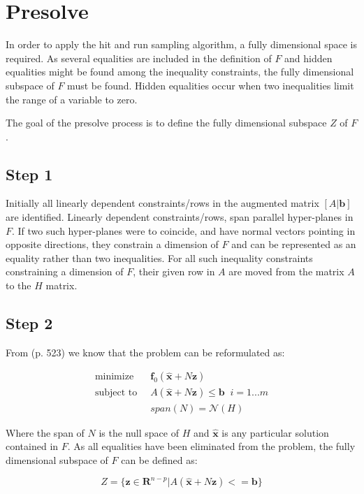 \documentclass[11pt,a4paper,english]{article}
\begin{document}
\section{Presolve}

In order to apply the hit and run sampling algorithm, a fully dimensional space is required. As several equalities are included in the definition of $F$ and hidden equalities might be found among the inequality constraints, the fully dimensional subspace of $F$ must be found. Hidden equalities occur when two inequalities limit the range of a variable to zero. 

The goal of the presolve process is to define the fully dimensional subspace $Z$ of $F$. 

\subsection{Step 1}
Initially all linearly dependent constraints/rows in the augmented matrix $[ A|\mathbf{b}] $ are identified. Linearly dependent constraints/rows, span parallel hyper-planes in $F$. If two such hyper-planes were to coincide, and have normal vectors pointing in opposite directions, they constrain a dimension of $F$ and can be represented as an equality rather than two inequalities. For all such inequality constraints constraining a dimension of $F$, their given row in $A$ are moved from the matrix $A$ to the $H$ matrix.

\subsection{Step 2}
From \cite{ConvexOpimization} (p. 523) we know that the problem can be reformulated as: 

\begin{align}
\text{minimize} \;&\; \mathbf{f}_0(\mathbf{\hat{x}} + N \mathbf{z})  \\
\text{subject to} \; &\; A(\mathbf{\hat{x}} + N \mathbf{z}) \leq \mathbf{b} \; \; i=1...m\\
\;            &\;  span(N) = \mathcal{N}(H)
\end{align}

Where the span of $N$ is the null space of $H$ and $\mathbf{\hat{x}}$ is any particular solution contained in $F$.
As all equalities have been eliminated from the problem, the fully dimensional subspace of $F$ can be defined as:

\begin{equation}
Z = \{\mathbf{z} \in \mathbf{R}^{n-p} | A(\mathbf{\hat{x}} +  N \mathbf{z}) <= \mathbf{b}  \}
\end{equation}
\end{document}
